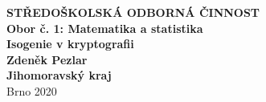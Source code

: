 \documentclass [12pt]{report}
\begin{document}
\newcommand{\ZZ}{{\mathbb{Z}}}
\newcommand{\cyc}[1]{{\langle #1 \rangle}}



\newtheorem{veta}{Věta}[section]
\newtheorem{definice}[veta]{Definice}
\newtheorem{dusledek}[veta]{Důsledek}
\newtheorem{lemma}[veta]{Lemma}
\newtheorem{poznamka}[veta]{Poznámka}
\newtheorem{priklad}[veta]{Příklad}
\theoremstyle{definition}




\setlength{\parindent}{2ex}

\def\nsd{\operatorname{nsd}}
\def\id{\operatorname{id}}
\def\char{\operatorname{char}}
\def\ker{\operatorname{ker}}
\def\Aut{\operatorname{Aut}}
\def\Gal{\operatorname{Gal}}
\def\Fix{\operatorname{Fix}}
\def\c{\operatorname{\mathbb{C}}}
\def\R{\operatorname{\mathbb{R}}}
\def\q{\operatorname{\mathbb{Q}}}
\def\e{\operatorname{\mathcal{V}}}
\def\z{\operatorname{\mathbb{Z}}}
\def\n{\operatorname{\mathbb{N}}}
\def\s{\operatorname{\subseteq}}
\def\w{\operatorname{\zeta}}
\def\fii{\operatorname{\varphi}}
\def\o{\operatorname{\mathcal{O}}}
\def\I{\operatorname{\mathcal{I}}}
\def\J{\operatorname{\mathcal{J}}}
\def\P{\operatorname{\mathcal{P}}}
\def\pn{\operatorname{\mathfrak{P}}}
\def\pn{\operatorname{\mathfrak{p}}}
\def\res{\operatorname{res}}

\begin{titlepage}
{
\centering
\LARGE \textbf{STŘEDOŠKOLSKÁ ODBORNÁ ČINNOST}\\
\Large\textbf{Obor č. 1: Matematika a statistika}\\
\vspace{6cm}
\LARGE\textbf{Isogenie v kryptografii}\\
}
\vspace{10cm}
{\noindent\large\bfseries Zdeněk Pezlar\\ 
	\large\bfseries Jihomoravský kraj\\ }
\center\large Brno 2020
	
\end{titlepage}
\end{document}
